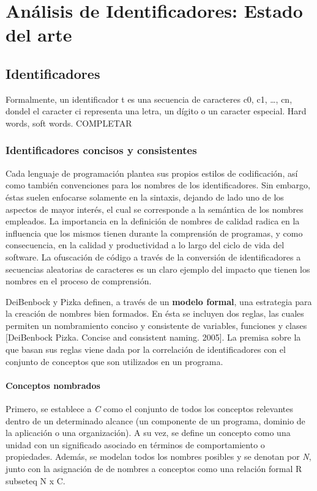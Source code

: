 \chapter{Análisis de Identificadores: Estado del arte}

\section{Identificadores}
Formalmente, un identificador t es una secuencia de caracteres c0, c1, …, cn, dondel el caracter ci representa una letra, un dígito o un caracter especial. Hard words, soft words. COMPLETAR

\subsection{Identificadores concisos y consistentes}
Cada lenguaje de programación plantea sus propios estilos de codificación, así como también convenciones para los nombres de los identificadores. Sin embargo, éstas suelen enfocarse solamente en la sintaxis, dejando de lado uno de los aspectos de mayor interés, el cual se corresponde a la semántica de los nombres empleados. La importancia en la definición de nombres de calidad radica en la influencia que los mismos tienen durante la comprensión de programas, y como consecuencia, en la calidad y productividad a lo largo del ciclo de vida del software. La ofuscación de código a través de la conversión de identificadores a secuencias aleatorias de caracteres es un claro ejemplo del impacto que tienen los nombres en el proceso de comprensión.

DeiBenbock y Pizka definen, a través de un \textbf{modelo formal}, una estrategia para la creación de nombres bien formados. En ésta se incluyen dos reglas, las cuales permiten un nombramiento conciso y consistente de variables, funciones y clases \cite{DeiBenbockPizka05} [DeiBenbock Pizka. Concise and consistent naming. 2005]. La premisa sobre la que basan sus reglas viene dada por la correlación de identificadores con el conjunto de conceptos que son utilizados en un programa.

\subsubsection{Conceptos nombrados}
Primero, se establece a \textit{C} como el conjunto de todos los conceptos relevantes dentro de un determinado alcance (un componente de un programa, dominio de la aplicación o una organización). A su vez, se define un concepto como una unidad con un significado asociado en términos de comportamiento o propiedades. Además, se modelan todos los nombres posibles y se denotan por \textit{N}, junto con la asignación de de nombres a conceptos como una relación formal R \\subseteq N x C.

